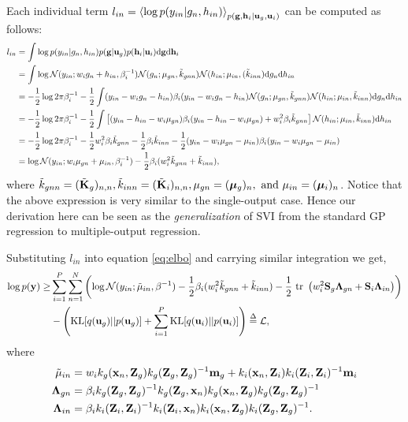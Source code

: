 \documentclass{article} %
\begin{document}
\noindent Each individual term $l_{in} = \left\langle \log p(y_{in} | g_n, h_{in}) \right\rangle_{p(\mathbf{g},\mathbf{h}_i | \mathbf{u}_g, \mathbf{u}_i)}$ can be computed as follows:
\begin{align}
\nonumber
l_{in} &= \int \log p(y_{in} | g_n, h_{in}) p(\mathbf{g} | \mathbf{u}_g) p(\mathbf{h}_i | \mathbf{u}_i) \mathrm{d} \mathbf{g} \mathrm{d} \mathbf{h}_i \\
\nonumber
&= \int \log \mathcal{N}(y_{in} ; w_i g_n + h_{in}, \beta_i^{-1}) 
\mathcal{N}(g_n ; \mu_{gn}, \tilde{k}_{gnn})
\mathcal{N}(h_{in} ; \mu_{in}, (\tilde{k}_{inn}) \mathrm{d} g_n \mathrm{d} h_{in} \\
\nonumber
&= -\frac{1}{2} \log 2 \pi \beta_i^{-1} - \frac{1}{2} \int (y_{in} - w_i g_n - h_{in}) \beta_i (y_{in} - w_i g_n - h_{in})
\mathcal{N}(g_n ; \mu_{gn}, \tilde{k}_{gnn})
\mathcal{N}(h_{in} ; \mu_{in}, \tilde{k}_{inn}) \mathrm{d} g_n \mathrm{d} h_{in} \\
\nonumber
&= -\frac{1}{2} \log 2 \pi \beta_i^{-1} - \frac{1}{2} \int \left[(y_{in} - h_{in} - w_i \mu_{gn}) \beta_i (y_{in} - h_{in} - w_i \mu_{gn}) + w_i^2 \beta_i \tilde{k}_{gnn} \right] 
\mathcal{N}(h_{in} ; \mu_{in}, \tilde{k}_{inn}) \mathrm{d} h_{in} \\
\nonumber
&= -\frac{1}{2} \log 2 \pi \beta_i^{-1} - \frac{1}{2} w_i^2 \beta_i \tilde{k}_{gnn}
- \frac{1}{2} \beta_i \tilde{k}_{inn} - \frac{1}{2} (y_{in} - w_i \mu_{gn} - \mu_{in}) \beta_i (y_{in} - w_i \mu_{gn} - \mu_{in}) \\
&= \log \mathcal{N}(y_{in}; w_i \mu_{gn} + \mu_{in}, \beta_i^{-1})  - \frac{1}{2} \beta_i (w_i^2 \tilde{k}_{gnn} + \tilde{k}_{inn}),
\end{align}
where $\tilde{k}_{gnn} = (\tilde{\mathbf{K}}_g)_{n,n}, \tilde{k}_{inn} = (\tilde{\mathbf{K}}_i)_{n,n}, \mu_{gn} = (\boldsymbol{\mu}_g)_n, \text{ and } \mu_{in} = (\boldsymbol{\mu}_i)_n$.
Notice that the above expression is very similar to the single-output case.
Hence our derivation here can be seen as the \textit{generalization} of SVI from the standard GP regression to multiple-output regression.

\noindent Substituting $l_{in}$ into equation \ref{eq:elbo} and carrying similar integration we get,
\begin{align}
\nonumber
\log p(\mathbf{y})
\ge& \sum_{i=1}^P \sum_{n=1}^N
 \left( \log \mathcal{N}(y_{in}; \tilde{\mu}_{in}, \beta^{-1})
         - \frac{1}{2} \beta_i (w_i^2 \tilde{k}_{gnn} + \tilde{k}_{inn})
         - \frac{1}{2} \mbox{ \rm tr } \left( w_i^2 \mathbf{S}_g \mathbf{\Lambda}_{gn} + \mathbf{S}_i \mathbf{\Lambda}_{in} \right)
\right) \\
&- \left( \text{KL}[q(\mathbf{u}_g) || p(\mathbf{u}_g)] + \sum_{i=1}^P \text{KL}[q(\mathbf{u}_i) || p(\mathbf{u}_i)] \right) \overset{\Delta}{=} \mathcal{L},
\end{align}
where 
\begin{align}
\tilde{\mu}_{in}
&= w_i k_g(\mathbf{x}_n, \mathbf{Z}_g)k_g(\mathbf{Z}_g,\mathbf{Z}_g)^{-1}\mathbf{m}_g + k_i(\mathbf{x}_n, \mathbf{Z}_i)k_i(\mathbf{Z}_i,\mathbf{Z}_i)^{-1}\mathbf{m}_i \\
\mathbf{\Lambda}_{gn}
&= \beta_i k_g(\mathbf{Z}_g,\mathbf{Z}_g)^{-1} k_g(\mathbf{Z}_g, \mathbf{x}_n) k_g(\mathbf{x}_n, \mathbf{Z}_g) k_g(\mathbf{Z}_g,\mathbf{Z}_g)^{-1} \\
\mathbf{\Lambda}_{in}
&= \beta_i k_i(\mathbf{Z}_i,\mathbf{Z}_i)^{-1} k_i(\mathbf{Z}_i, \mathbf{x}_n) k_i(\mathbf{x}_n, \mathbf{Z}_g) k_i(\mathbf{Z}_g,\mathbf{Z}_g)^{-1}.
\end{align}
\end{document}
